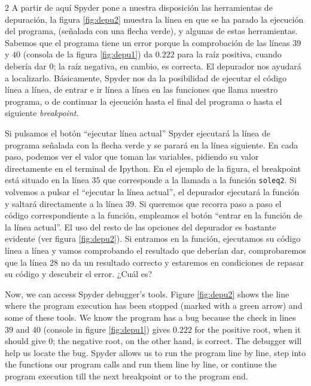 \begin{paracol}{2}
A partir de aquí Spyder pone a nuestra disposición las herramientas de depuración, la figura \ref{fig:depu2} muestra la línea en que se ha parado la ejecución del programa, (señalada con una flecha verde), y algunas de estas herramientas. Sabemos que el programa tiene un error porque la comprobación de las líneas $39$ y $40$ (consola de la figura \ref{fig:depu1}) da $0.222$ para la raíz positiva, cuando debería dar $0$; la raíz negativa, en cambio, es correcta. El depurador nos ayudará a localizarlo.  Básicamente, Spyder nos da la posibilidad de ejecutar el código línea a línea, de entrar e ir línea a línea en las funciones que llama nuestro programa, o de continuar la ejecución hasta el final del programa o hasta el siguiente \emph{breakpoint}.

Si pulsamos el botón ``ejecutar línea actual'' Spyder ejecutará la línea de programa señalada con la flecha verde y se parará en la línea siguiente. En cada paso, podemos ver el valor que toman las variables, pidiendo su valor directamente en el terminal de Ipython. En el ejemplo de la figura, el breakpoint está situado en la línea $35$ que corresponde a la llamada a la función \texttt{soleq2}. Si volvemos a pulsar el ``ejecutar la línea actual'', el depurador ejecutará la función y saltará directamente a la línea $39$. Si queremos que recorra paso a paso el código correspondiente a la función, empleamos el botón ``entrar en la función de la línea actual''. El uso del resto de las opciones del depurador es bastante evidente (ver figura \ref{fig:depu2}). Si entramos en la función, ejecutamos su código línea a línea y vamos comprobando el resultado que deberían dar, comprobaremos que la línea $28$ no da un resultado correcto y estaremos en condiciones de repasar su código y descubrir el error. ¿Cuál es?

\switchcolumn
Now, we can access Spyder debugger's tools. Figure \ref{fig:depu2} shows the line where the program execution has been stopped (marked with a green arrow) and some of these tools. We know the program has a bug because the check in lines $39$ and $40$ (console in figure \ref{fig:depu1}) gives $0.222$ for the positive root, when it should give $0$; the negative root, on the other hand, is correct. The debugger will help us locate the bug. Spyder allows us to run the program line by line, step into the functions our program calls and run them line by line, or continue the program execution till the next breakpoint or to the program end. 


\end{paracol}
